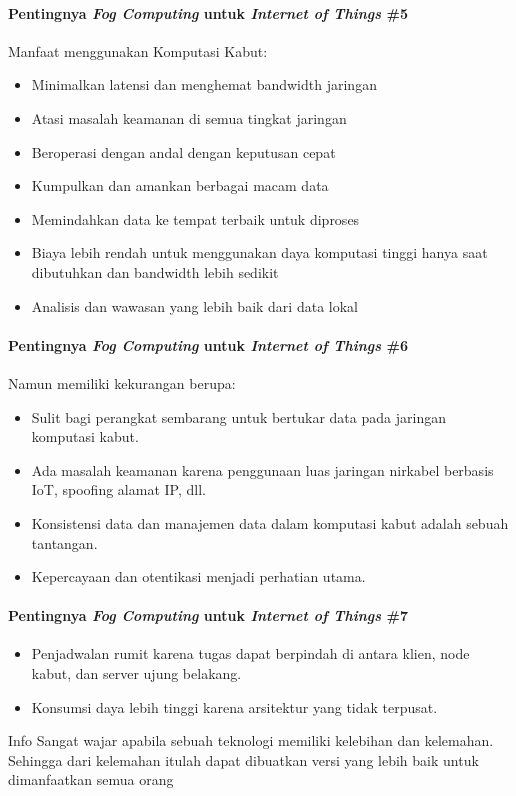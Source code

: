 \begin{frame}{\insertsectionhead}
	\framesubtitle{Pentingnya \textit{Fog Computing} untuk \textit{Internet of Things} \#5}
	\justifying
	Manfaat menggunakan Komputasi Kabut:
	\vfill
	\begin{itemize}
		\item Minimalkan latensi dan menghemat bandwidth jaringan
		\item Atasi masalah keamanan di semua tingkat jaringan
		\item Beroperasi dengan andal dengan keputusan cepat
		\item Kumpulkan dan amankan berbagai macam data
		\item Memindahkan data ke tempat terbaik untuk diproses
		\item Biaya lebih rendah untuk menggunakan daya komputasi tinggi hanya saat dibutuhkan dan bandwidth lebih sedikit
		\item Analisis dan wawasan yang lebih baik dari data lokal
	\end{itemize}
\end{frame}

\begin{frame}{\insertsectionhead}
	\framesubtitle{Pentingnya \textit{Fog Computing} untuk \textit{Internet of Things} \#6}
	\justifying
	Namun memiliki kekurangan berupa:
	\vfill
	\begin{itemize}
		\item Sulit bagi perangkat sembarang untuk bertukar data pada jaringan komputasi kabut.
		\item Ada masalah keamanan karena penggunaan luas jaringan nirkabel berbasis IoT, spoofing alamat IP, dll.
		\item Konsistensi data dan manajemen data dalam komputasi kabut adalah sebuah tantangan.
		\item Kepercayaan dan otentikasi menjadi perhatian utama.
	\end{itemize}
\end{frame}

\begin{frame}{\insertsectionhead}
	\framesubtitle{Pentingnya \textit{Fog Computing} untuk \textit{Internet of Things} \#7}
	\justifying
	\begin{itemize}
		\item Penjadwalan rumit karena tugas dapat berpindah di antara klien, node kabut, dan server ujung belakang.
		\item Konsumsi daya lebih tinggi karena arsitektur yang tidak terpusat.
	\end{itemize}
	\vfill
	\begin{block}{Info}
		Sangat wajar apabila sebuah teknologi memiliki kelebihan dan kelemahan. Sehingga dari kelemahan itulah dapat dibuatkan versi yang lebih baik untuk dimanfaatkan semua orang
	\end{block}
\end{frame}

